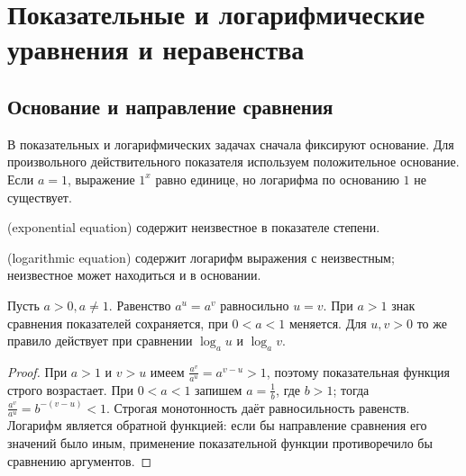 \chapter{Показательные и логарифмические уравнения и неравенства}\label{chap:exam-exponential}
\section{Основание и направление сравнения}
В показательных и логарифмических задачах сначала фиксируют основание. Для произвольного действительного показателя используем положительное основание. Если \(a=1\), выражение \(1^x\) равно единице, но логарифма по основанию \(1\) не существует.
\begin{definition} (exponential equation) содержит неизвестное в показателе степени.\end{definition}
\begin{definition} (logarithmic equation) содержит логарифм выражения с неизвестным; неизвестное может находиться и в основании.\end{definition}
\begin{theorem}
Пусть \(a>0,a\ne1\). Равенство \(a^u=a^v\) равносильно \(u=v\). При \(a>1\) знак сравнения показателей сохраняется, при \(0<a<1\) меняется. Для \(u,v>0\) то же правило действует при сравнении \(\log_a u\) и \(\log_a v\).
\end{theorem}
\begin{proof}При \(a>1\) и \(v>u\) имеем \(\frac{a^v}{a^u}=a^{v-u}>1\), поэтому показательная функция строго возрастает. При \(0<a<1\) запишем \(a=\frac1b\), где \(b>1\); тогда \(\frac{a^v}{a^u}=b^{-(v-u)}<1\). Строгая монотонность даёт равносильность равенств. Логарифм является обратной функцией: если бы направление сравнения его значений было иным, применение показательной функции противоречило бы сравнению аргументов.\end{proof}
